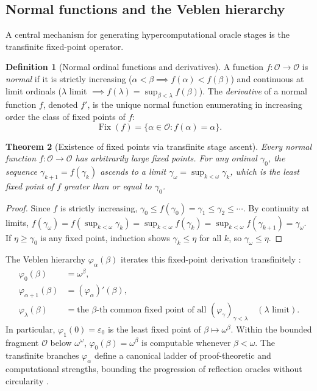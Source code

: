 \documentclass[11pt]{article}
\newtheorem{theorem}{Theorem}[section]
\theoremstyle{definition}
\newtheorem{definition}[theorem]{Definition}
\newcommand{\Ord}{\mathcal O}
\begin{document}
\subsection{Normal functions and the Veblen hierarchy}
A central mechanism for generating hypercomputational oracle stages is the transfinite fixed-point operator.

\begin{definition}[Normal ordinal functions and derivatives]
A function $f\colon \Ord \to \Ord$ is \emph{normal} if it is strictly increasing ($\alpha < \beta \implies f(\alpha) < f(\beta)$) and continuous at limit ordinals ($\lambda$ limit $\implies f(\lambda) = \sup_{\beta < \lambda} f(\beta)$).
The \emph{derivative} of a normal function $f$, denoted $f'$, is the unique normal function enumerating in increasing order the class of fixed points of $f$:
\[
\operatorname{Fix}(f) = \{\alpha \in \Ord : f(\alpha) = \alpha\}.
\]
\end{definition}

\begin{theorem}[Existence of fixed points via transfinite stage ascent]
Every normal function $f\colon \Ord \to \Ord$ has arbitrarily large fixed points. For any ordinal $\gamma_0$, the sequence $\gamma_{k+1} = f(\gamma_k)$ ascends to a limit $\gamma_\omega = \sup_{k<\omega} \gamma_k$, which is the least fixed point of $f$ greater than or equal to $\gamma_0$.
\end{theorem}
\begin{proof}
Since $f$ is strictly increasing, $\gamma_0 \le f(\gamma_0) = \gamma_1 \le \gamma_2 \le \cdots$. By continuity at limits, $f(\gamma_\omega) = f(\sup_{k<\omega} \gamma_k) = \sup_{k<\omega} f(\gamma_k) = \sup_{k<\omega} f(\gamma_{k+1}) = \gamma_\omega$. If $\eta \ge \gamma_0$ is any fixed point, induction shows $\gamma_k \le \eta$ for all $k$, so $\gamma_\omega \le \eta$.
\end{proof}

The Veblen hierarchy $\varphi_\alpha(\beta)$ iterates this fixed-point derivation transfinitely \cite{veblen}:
\begin{align*}
\varphi_0(\beta) &= \omega^\beta,\\
\varphi_{\alpha+1}(\beta) &= (\varphi_\alpha)'(\beta),\\
\varphi_\lambda(\beta) &= \text{the $\beta$-th common fixed point of all } (\varphi_\gamma)_{\gamma < \lambda} \quad (\lambda \text{ limit}).
\end{align*}
In particular, $\varphi_1(0) = \varepsilon_0$ is the least fixed point of $\beta \mapsto \omega^\beta$. Within the bounded fragment $\Ord$ below $\omega^\omega$, $\varphi_0(\beta) = \omega^\beta$ is computable whenever $\beta < \omega$. The transfinite branches $\varphi_\alpha$ define a canonical ladder of proof-theoretic and computational strengths, bounding the progression of reflection oracles without circularity \cite{pohlers}.
\end{document}
